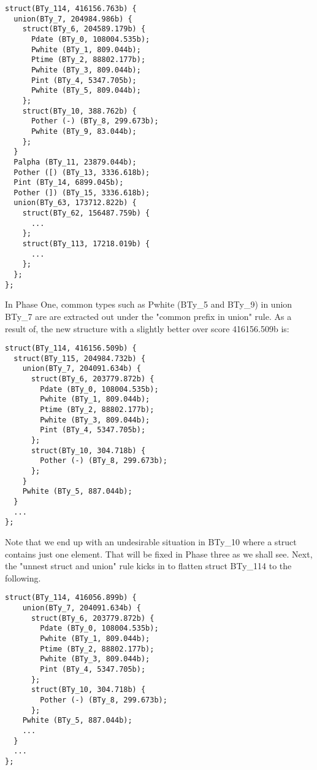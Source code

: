{\small
\begin{verbatim}
struct(BTy_114, 416156.763b) {
  union(BTy_7, 204984.986b) {
    struct(BTy_6, 204589.179b) {
      Pdate (BTy_0, 108004.535b);
      Pwhite (BTy_1, 809.044b);
      Ptime (BTy_2, 88802.177b);
      Pwhite (BTy_3, 809.044b);
      Pint (BTy_4, 5347.705b);
      Pwhite (BTy_5, 809.044b);
    };
    struct(BTy_10, 388.762b) {
      Pother (-) (BTy_8, 299.673b);
      Pwhite (BTy_9, 83.044b);
    };
  }
  Palpha (BTy_11, 23879.044b);
  Pother ([) (BTy_13, 3336.618b);
  Pint (BTy_14, 6899.045b);
  Pother (]) (BTy_15, 3336.618b);
  union(BTy_63, 173712.822b) {
    struct(BTy_62, 156487.759b) {
      ...
    };
    struct(BTy_113, 17218.019b) {
      ...
    };
  };
};
\end{verbatim}
}

In Phase One, common types such as Pwhite (BTy\_5 and BTy\_9) in union BTy\_7 are
are extracted out under the "common prefix in union" rule.
As a result of, the new structure with a slightly better over score 416156.509b is:

{\small
\begin{verbatim}
struct(BTy_114, 416156.509b) {
  struct(BTy_115, 204984.732b) {
    union(BTy_7, 204091.634b) {
      struct(BTy_6, 203779.872b) {
        Pdate (BTy_0, 108004.535b);
        Pwhite (BTy_1, 809.044b);
        Ptime (BTy_2, 88802.177b);
        Pwhite (BTy_3, 809.044b);
        Pint (BTy_4, 5347.705b);
      };
      struct(BTy_10, 304.718b) {
        Pother (-) (BTy_8, 299.673b);
      };
    }
    Pwhite (BTy_5, 887.044b);
  }
  ...
};
\end{verbatim}
}

Note that we end up with an undesirable situation in BTy\_10 where a struct 
contains just one element. That will be fixed in Phase three as we shall see.
Next, the "unnest struct and union" rule kicks in to flatten struct BTy\_114 to
the following.

{\small
\begin{verbatim}
struct(BTy_114, 416056.899b) {
    union(BTy_7, 204091.634b) {
      struct(BTy_6, 203779.872b) {
        Pdate (BTy_0, 108004.535b);
        Pwhite (BTy_1, 809.044b);
        Ptime (BTy_2, 88802.177b);
        Pwhite (BTy_3, 809.044b);
        Pint (BTy_4, 5347.705b);
      };
      struct(BTy_10, 304.718b) {
        Pother (-) (BTy_8, 299.673b);
      };
    Pwhite (BTy_5, 887.044b);
    ...
  }
  ...
};
\end{verbatim}
}

